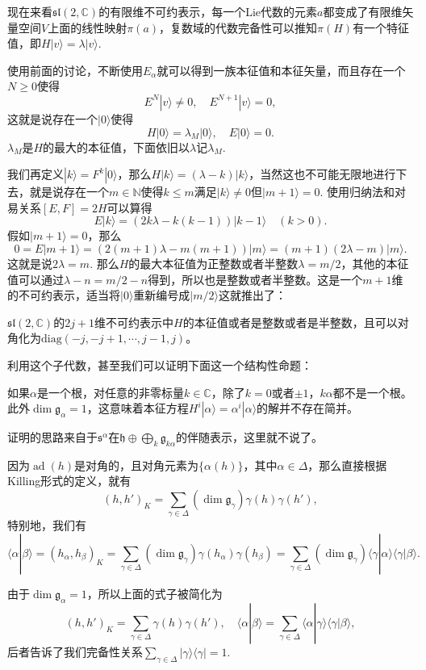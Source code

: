 \documentclass[10pt]{article}
\newcommand{\cc}{\mathbb{C}}
\newcommand{\lag}{{\mathfrak{g}}}
\DeclareMathOperator{\ad}{ad}
\begin{document}
\para 现在来看$\mathfrak{sl}(2,\cc)$的有限维不可约表示，每一个Lie代数的元素$a$都变成了有限维矢量空间$V$上面的线性映射$\pi(a)$，复数域的代数完备性可以推知$\pi(H)$有一个特征值，即$H|v\rangle=\lambda |v\rangle$.

使用前面的讨论，不断使用$E_\alpha$就可以得到一族本征值和本征矢量，而且存在一个$N\geq 0$使得
\[
	E^N|v\rangle\neq 0,\quad E^{N+1}|v\rangle =0,
\]
这就是说存在一个$|0\rangle$使得
\[
	H|0\rangle =\lambda_M |0\rangle,\quad E|0\rangle =0.
\]
$\lambda_M$是$H$的最大的本征值，下面依旧以$\lambda$记$\lambda_M$.

我们再定义$|k\rangle=F^k|0\rangle$，那么$H|k\rangle=(\lambda-k) |k\rangle$，当然这也不可能无限地进行下去，就是说存在一个$m\in \mathbb{N}$使得$k\leq m$满足$|k\rangle\neq 0$但$|m+1\rangle=0$. 使用归纳法和对易关系$[E,F]=2H$可以算得
\[
E|k\rangle=(2k\lambda -k(k-1)) |k-1\rangle\quad (k>0).
\]
假如$|m+1\rangle =0$，那么
\[
0=E|m+1\rangle=(2(m+1)\lambda -m(m+1)) |m\rangle =(m+1)(2\lambda-m)|m\rangle.
\]
这就是说$2\lambda=m$. 那么$H$的最大本征值为正整数或者半整数$\lambda=m/2$，其他的本征值可以通过$\lambda-n=m/2-n$得到，所以也是整数或者半整数。这是一个$m+1$维的不可约表示，适当将$|0\rangle$重新编号成$|m/2\rangle$这就推出了：

\pro $\mathfrak{sl}(2,\cc)$的$2j+1$维不可约表示中$H$的本征值或者是整数或者是半整数，且可以对角化为$\mathrm{diag}(-j,-j+1,\cdots,j-1,j)$。

利用这个子代数，甚至我们可以证明下面这一个结构性命题：

\pro 如果$\alpha$是一个根，对任意的非零标量$k\in \cc$，除了$k=0$或者$\pm 1$，$k\alpha$都不是一个根。此外$\dim \lag_{\alpha}=1$，这意味着本征方程$H^i|\alpha\rangle = \alpha^i|\alpha\rangle$的解并不存在简并。

证明的思路来自于$\mathfrak{s}^\alpha$在$\mathfrak{h} \oplus \bigoplus_k \lag_{k\alpha}$的伴随表示，这里就不说了。

\para 因为$\ad(h)$是对角的，且对角元素为$\{\alpha(h)\}$，其中$\alpha\in\Delta$，那么直接根据Killing形式的定义，就有
\[
	(h,h')_K=\sum_{\gamma \in \Delta}(\dim \lag_\gamma)\gamma(h)\gamma(h'),
\]
特别地，我们有
\[
	\langle \alpha|\beta \rangle=(h_\alpha,h_\beta)_K=\sum_{\gamma \in \Delta}(\dim \lag_\gamma)\gamma(h_\alpha)\gamma(h_\beta)=\sum_{\gamma \in \Delta}(\dim \lag_\gamma)\langle \gamma|\alpha\rangle\langle \gamma|\beta\rangle.
\]

由于$\dim \lag_{\alpha}=1$，所以上面的式子被简化为
\[
	(h,h')_K=\sum_{\gamma \in \Delta}\gamma(h)\gamma(h'),\quad \langle \alpha|\beta \rangle=\sum_{\gamma \in \Delta}\langle \alpha|\gamma\rangle\langle \gamma|\beta\rangle,
\]
后者告诉了我们完备性关系$\sum_{\gamma\in \Delta}|\gamma\rangle\langle \gamma|=1$.
\end{document}
